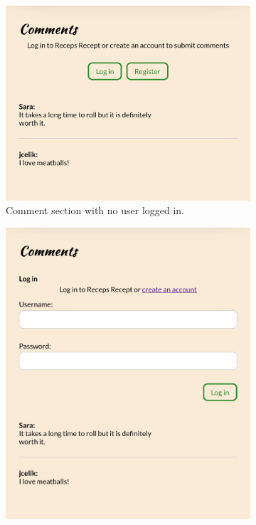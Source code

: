 \documentclass[a4paper]{scrartcl}
\begin{document}
\begin{figure}
	\centering
	\begin{subfigure}[b]{0.3\linewidth}
			\includegraphics[width=\linewidth]{images/screenshot-comments-logged_out.png}
			\caption{Comment section with no user logged in.}
	\end{subfigure}
	\begin{subfigure}[b]{0.3\linewidth}
		\includegraphics[width=\linewidth]{images/screenshot-comments-login.png}

\end{subfigure}
\end{figure}
\end{document}
